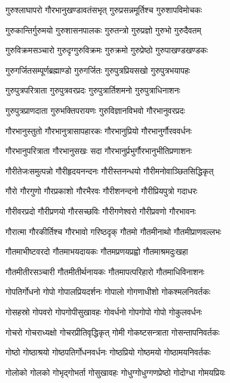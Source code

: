 \twolineshloka
{गुरुश्लाघापरो गौरभानुखण्डावतंसभृत्}%
{गुरुप्रसन्नमूर्तिश्च गुरुशापविमोचकः}%

\twolineshloka
{गुरुकान्तिर्गुरुमयो गुरुशासनपालकः}%
{गुरुतन्त्रो गुरुप्रज्ञो गुरुभो गुरुदैवतम्}%

\twolineshloka
{गुरुविक्रमसञ्चारो गुरुदृग्गुरुविक्रमः}%
{गुरुक्रमो गुरुप्रेष्ठो गुरुपाखण्डखण्डकः}%

\twolineshloka
{गुरुगर्जितसम्पूर्णब्रह्माण्डो गुरुगर्जितः}%
{गुरुपुत्रप्रियसखो गुरुपुत्रभयापहः}%

\twolineshloka
{गुरुपुत्रपरित्राता गुरुपुत्रवरप्रदः}%
{गुरुपुत्रार्तिशमनो गुरुपुत्राधिनाशनः}%

\twolineshloka
{गुरुपुत्रप्राणदाता गुरुभक्तिपरायणः}%
{गुरुविज्ञानविभवो गौरभानुवरप्रदः}%

\twolineshloka
{गौरभानुस्तुतो गौरभानुत्रासापहारकः}%
{गौरभानुप्रियो गौरभानुर्गौरववर्धनः}%

\twolineshloka
{गौरभानुपरित्राता गौरभानुसखः सदा}%
{गौरभानुर्प्रभुर्गौरभानुभीतिप्रणाशनः}%

\twolineshloka
{गौरीतेजःसमुत्पन्नो गौरीहृदयनन्दनः}%
{गौरीस्तनन्धयो गौरीमनोवाञ्छितसिद्धिकृत्}%

\twolineshloka
{गौरो गौरगुणो गौरप्रकाशो गौरभैरवः}%
{गौरीशनन्दनो गौरीप्रियपुत्रो गदाधरः}%

\twolineshloka
{गौरीवरप्रदो गौरीप्रणयो गौरसच्छविः}%
{गौरीगणेश्वरो गौरीप्रवणो गौरभावनः}%

\twolineshloka
{गौरात्मा गौरकीर्तिश्च गौरभावो गरिष्ठदृक्}%
{गौतमो गौतमीनाथो गौतमीप्राणवल्लभः}%

\twolineshloka
{गौतमाभीष्टवरदो गौतमाभयदायकः}%
{गौतमप्रणयप्रह्वो गौतमाश्रमदुःखहा}%

\twolineshloka
{गौतमीतीरसञ्चारी गौतमीतीर्थनायकः}%
{गौतमापत्परिहारो गौतमाधिविनाशनः}%

\twolineshloka
{गोपतिर्गोधनो गोपो गोपालप्रियदर्शनः}%
{गोपालो गोगणाधीशो गोकश्मलनिवर्तकः}%

\twolineshloka
{गोसहस्रो गोपवरो गोपगोपीसुखावहः}%
{गोवर्धनो गोपगोपो गोपो गोकुलवर्धनः}%

\twolineshloka
{गोचरो गोचराध्यक्षो गोचरप्रीतिवृद्धिकृत्}%
{गोमी गोकष्टसन्त्राता गोसन्तापनिवर्तकः}%

\twolineshloka
{गोष्ठो गोष्ठाश्रयो गोष्ठपतिर्गोधनवर्धनः}%
{गोष्ठप्रियो गोष्ठमयो गोष्ठामयनिवर्तकः}%

\twolineshloka
{गोलोको गोलको गोभृद्गोभर्ता गोसुखावहः}%
{गोधुग्गोधुग्गणप्रेष्ठो गोदोग्धा गोमयप्रियः}%

